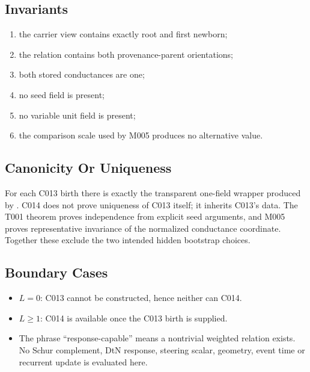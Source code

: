 \subsection{Invariants}\label{invariants-4}

\begin{enumerate}
\def\labelenumi{\arabic{enumi}.}
\tightlist
\item
  the carrier view contains exactly root and first newborn;
\item
  the relation contains both provenance-parent orientations;
\item
  both stored conductances are one;
\item
  no seed field is present;
\item
  no variable unit field is present;
\item
  the comparison scale used by M005 produces no alternative
  \texttt{\protect{}} value.
\end{enumerate}

\subsection{Canonicity Or Uniqueness}\label{canonicity-or-uniqueness-4}

For each C013 birth there is exactly the transparent one-field wrapper
produced by \texttt{\protect{}}. C014 does not prove uniqueness of C013
itself; it inherits C013's data. The T001 theorem proves independence
from explicit seed arguments, and M005 proves representative invariance
of the normalized conductance coordinate. Together these exclude the two
intended hidden bootstrap choices.

\subsection{Boundary Cases}\label{boundary-cases-4}

\begin{itemize}
\tightlist
\item
  \(L=0\): C013 cannot be constructed, hence neither can C014.
\item
  \(L\ge1\): C014 is available once the C013 birth is supplied.
\item
  The phrase ``response-capable'' means a nontrivial weighted relation
  exists. No Schur complement, DtN response, steering scalar, geometry,
  event time or recurrent update is evaluated here.
\end{itemize}

